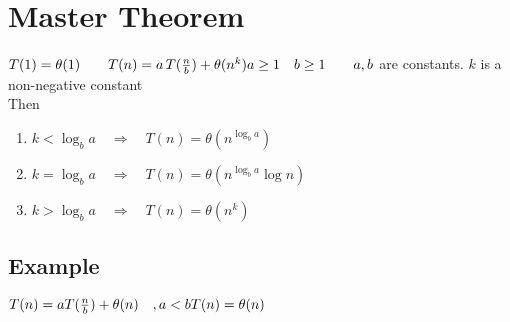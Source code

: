 \documentclass{article}
\theoremstyle{definition}
\theoremstyle{remark}
\theoremstyle{plain}
\begin{document}
\section{Master Theorem}
$T(1) = \theta(1) \qquad T(n) = a\, T(\frac{n}{b}) + \theta(n^k)\\
a \ge 1 \quad b \ge 1 \qquad a, b$ are constants. $k$ is a non-negative constant\\

Then\\
\begin{enumerate}
\item $k < \log_b a \quad \Rightarrow \quad T(n) = \theta(n^{\log_b a})$
\item $k = \log_b a \quad \Rightarrow \quad T(n) = \theta(n^{\log_b a} \log n)$
\item $k > \log_b a \quad \Rightarrow \quad T(n) = \theta(n^k)$
\end{enumerate}
	
	
\subsection{Example}	
$T(n) = a T(\frac{n}{b}) + \theta(n) \quad, a < b\\
T(n) = \theta(n)$	
\end{document}
